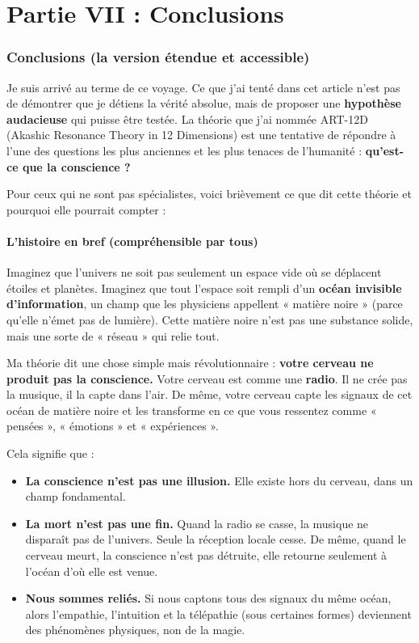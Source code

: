 \part*{Partie VII : Conclusions}

\section{Conclusions (la version étendue et accessible)}
Je suis arrivé au terme de ce voyage. Ce que j'ai tenté dans cet article n'est pas de démontrer que je détiens la vérité absolue, mais de proposer une \textbf{hypothèse audacieuse} qui puisse être testée. La théorie que j'ai nommée ART-12D (Akashic Resonance Theory in 12 Dimensions) est une tentative de répondre à l'une des questions les plus anciennes et les plus tenaces de l'humanité : \textbf{qu'est-ce que la conscience ?}

Pour ceux qui ne sont pas spécialistes, voici brièvement ce que dit cette théorie et pourquoi elle pourrait compter :

\subsection{L'histoire en bref (compréhensible par tous)}
Imaginez que l'univers ne soit pas seulement un espace vide où se déplacent étoiles et planètes. Imaginez que tout l'espace soit rempli d'un \textbf{océan invisible d'information}, un champ que les physiciens appellent « matière noire » (parce qu'elle n'émet pas de lumière). Cette matière noire n'est pas une substance solide, mais une sorte de « réseau » qui relie tout.

Ma théorie dit une chose simple mais révolutionnaire : \textbf{votre cerveau ne produit pas la conscience.} Votre cerveau est comme une \textbf{radio}. Il ne crée pas la musique, il la capte dans l'air. De même, votre cerveau capte les signaux de cet océan de matière noire et les transforme en ce que vous ressentez comme « pensées », « émotions » et « expériences ».

Cela signifie que :
\begin{itemize}
    \item \textbf{La conscience n'est pas une illusion.} Elle existe hors du cerveau, dans un champ fondamental.
    \item \textbf{La mort n'est pas une fin.} Quand la radio se casse, la musique ne disparaît pas de l'univers. Seule la réception locale cesse. De même, quand le cerveau meurt, la conscience n'est pas détruite, elle retourne seulement à l'océan d'où elle est venue.
    \item \textbf{Nous sommes reliés.} Si nous captons tous des signaux du même océan, alors l'empathie, l'intuition et la télépathie (sous certaines formes) deviennent des phénomènes physiques, non de la magie.
\end{itemize}

